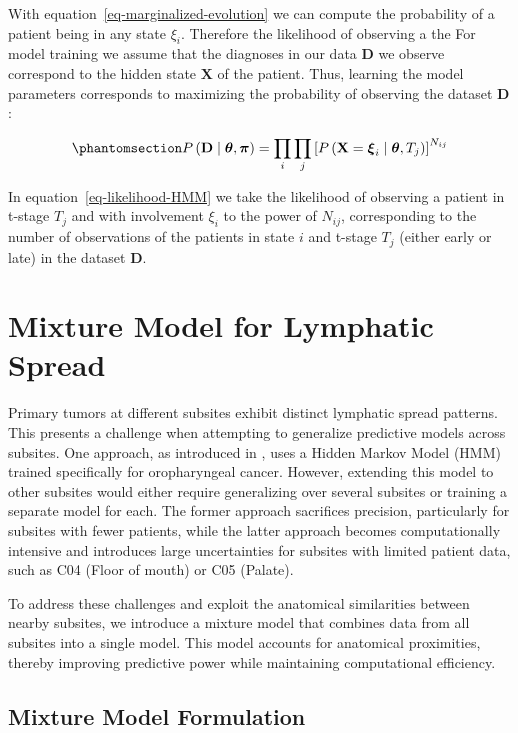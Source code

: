 \documentclass[
  sn-mathphys-num,
]{sn-jnl}
\begin{document}
With equation~\ref{eq-marginalized-evolution} we can compute the
probability of a patient being in any state \(\xi_i\). Therefore the
likelihood of observing a the For model training we assume that the
diagnoses in our data \(\mathbf{D}\) we observe correspond to the hidden
state \(\mathbf{X}\) of the patient. Thus, learning the model parameters
corresponds to maximizing the probability of observing the dataset
\(\mathbf{D}\):

\begin{equation}\phantomsection\label{eq-likelihood-HMM}{
P \left( \mathbf{D} \mid \boldsymbol{\theta}, \boldsymbol{\pi}\right) = \prod_i \prod_j \left[P \left( \mathbf{X}=\boldsymbol{\xi}_i \mid \boldsymbol{\theta}, T_j \right) \right]^{N_{ij}}
}\end{equation}

In equation~\ref{eq-likelihood-HMM} we take the likelihood of observing
a patient in t-stage \(T_j\) and with involvement \(\xi_i\) to the power
of \(N_{ij}\), corresponding to the number of observations of the
patients in state \(i\) and t-stage \(T_j\) (either early or late) in
the dataset \(\mathbf{D}\).

\section{Mixture Model for Lymphatic Spread}\label{sec-mixture}

Primary tumors at different subsites exhibit distinct lymphatic spread
patterns. This presents a challenge when attempting to generalize
predictive models across subsites. One approach, as introduced in
\citep{ludwig_dynamic_2021}, uses a Hidden Markov Model (HMM) trained
specifically for oropharyngeal cancer. However, extending this model to
other subsites would either require generalizing over several subsites
or training a separate model for each. The former approach sacrifices
precision, particularly for subsites with fewer patients, while the
latter approach becomes computationally intensive and introduces large
uncertainties for subsites with limited patient data, such as C04 (Floor
of mouth) or C05 (Palate).

To address these challenges and exploit the anatomical similarities
between nearby subsites, we introduce a mixture model that combines data
from all subsites into a single model. This model accounts for
anatomical proximities, thereby improving predictive power while
maintaining computational efficiency.

\subsection{Mixture Model Formulation}\label{mixture-model-formulation}
\end{document}
